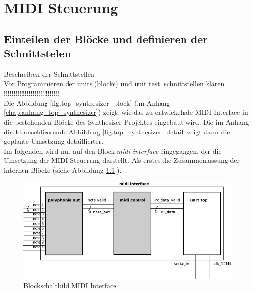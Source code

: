 
\chapter{MIDI Steuerung}\label{chap.midi}

\section{Einteilen der Blöcke und definieren der Schnittstelen}
Beschreiben der Schnittstellen\\
Vor Programmieren der units (blöcke) und unit test, schnittstellen klären \\
!!!!!!!!!!!!!!!!!!!!!!!!!!!!!\\
\newline
Die Abbildung \ref{fig.top_synthesizer_block} (im Anhang \ref{chap.anhang_top_synthesizer}) zeigt, wie das zu entwickelnde MIDI Interface in die bestehenden Blöcke des Synthesizer-Projektes eingebaut wird. Die im Anhang direkt anschliessende Abbildung \ref{fig.top_synthesizer_detail} zeigt dann die geplante Umsetzung detaillierter.\\
\newline
Im folgenden wird nur auf den Block \textit{midi interface} eingegangen, der die Umsetzung der MIDI Steuerung darstellt. Als erstes die Zusammenfassung der internen Blöcke (siehe Abbildung \ref{fig.midi_interface_block} ).\\
\begin{figure}[H]
	\centering
	\includegraphics[width=1\textwidth]{images/midi_interface/midi_interface_block.png}
	\caption{Blockschaltbild MIDI Interface}
	\label{fig.midi_interface_block}
\end{figure}

